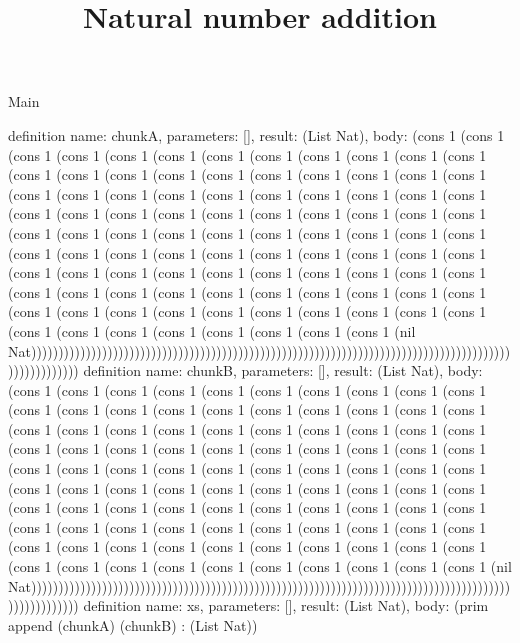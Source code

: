 \begin{lexlean}{Main}
\title{Natural number addition}
\begin{semanticmodule}
definition{ name: chunkA, parameters: [], result: (List Nat), body: (cons 1 (cons 1 (cons 1 (cons 1 (cons 1 (cons 1 (cons 1 (cons 1 (cons 1 (cons 1 (cons 1 (cons 1 (cons 1 (cons 1 (cons 1 (cons 1 (cons 1 (cons 1 (cons 1 (cons 1 (cons 1 (cons 1 (cons 1 (cons 1 (cons 1 (cons 1 (cons 1 (cons 1 (cons 1 (cons 1 (cons 1 (cons 1 (cons 1 (cons 1 (cons 1 (cons 1 (cons 1 (cons 1 (cons 1 (cons 1 (cons 1 (cons 1 (cons 1 (cons 1 (cons 1 (cons 1 (cons 1 (cons 1 (cons 1 (cons 1 (cons 1 (cons 1 (cons 1 (cons 1 (cons 1 (cons 1 (cons 1 (cons 1 (cons 1 (cons 1 (cons 1 (cons 1 (cons 1 (cons 1 (cons 1 (cons 1 (cons 1 (cons 1 (cons 1 (cons 1 (cons 1 (cons 1 (cons 1 (cons 1 (cons 1 (cons 1 (cons 1 (cons 1 (cons 1 (cons 1 (cons 1 (cons 1 (cons 1 (cons 1 (cons 1 (cons 1 (cons 1 (cons 1 (cons 1 (cons 1 (cons 1 (cons 1 (cons 1 (cons 1 (cons 1 (cons 1 (cons 1 (cons 1 (cons 1 (cons 1 (nil Nat))))))))))))))))))))))))))))))))))))))))))))))))))))))))))))))))))))))))))))))))))))))))))))))))))))) }
definition{ name: chunkB, parameters: [], result: (List Nat), body: (cons 1 (cons 1 (cons 1 (cons 1 (cons 1 (cons 1 (cons 1 (cons 1 (cons 1 (cons 1 (cons 1 (cons 1 (cons 1 (cons 1 (cons 1 (cons 1 (cons 1 (cons 1 (cons 1 (cons 1 (cons 1 (cons 1 (cons 1 (cons 1 (cons 1 (cons 1 (cons 1 (cons 1 (cons 1 (cons 1 (cons 1 (cons 1 (cons 1 (cons 1 (cons 1 (cons 1 (cons 1 (cons 1 (cons 1 (cons 1 (cons 1 (cons 1 (cons 1 (cons 1 (cons 1 (cons 1 (cons 1 (cons 1 (cons 1 (cons 1 (cons 1 (cons 1 (cons 1 (cons 1 (cons 1 (cons 1 (cons 1 (cons 1 (cons 1 (cons 1 (cons 1 (cons 1 (cons 1 (cons 1 (cons 1 (cons 1 (cons 1 (cons 1 (cons 1 (cons 1 (cons 1 (cons 1 (cons 1 (cons 1 (cons 1 (cons 1 (cons 1 (cons 1 (cons 1 (cons 1 (cons 1 (cons 1 (cons 1 (cons 1 (cons 1 (cons 1 (cons 1 (cons 1 (cons 1 (cons 1 (cons 1 (cons 1 (cons 1 (cons 1 (cons 1 (cons 1 (cons 1 (cons 1 (cons 1 (cons 1 (nil Nat))))))))))))))))))))))))))))))))))))))))))))))))))))))))))))))))))))))))))))))))))))))))))))))))))))) }
definition{ name: xs, parameters: [], result: (List Nat), body: (prim append (chunkA) (chunkB) : (List Nat)) }
\end{semanticmodule}
\end{lexlean}
